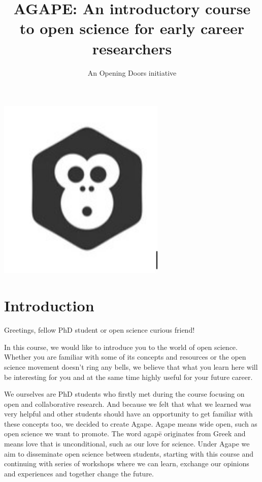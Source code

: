 \documentclass[
]{book}
\title{AGAPE: An introductory course to open science for early career researchers}
\author{An Opening Doors initiative}
\date{}
\theoremstyle{definition}
\theoremstyle{definition}
\theoremstyle{definition}
\theoremstyle{definition}
\theoremstyle{remark}
\begin{document}
\maketitle

{
\setcounter{tocdepth}{1}
\tableofcontents
}
\includegraphics[width=0.6\textwidth,height=\textheight]{images/agapecover.png}

\hypertarget{introduction}{%
\chapter*{Introduction}\label{introduction}}

Greetings, fellow PhD student or open science curious friend!

In this course, we would like to introduce you to the world of open science. Whether you are familiar with some of its concepts and resources or the open science movement doesn't ring any bells, we believe that what you learn here will be interesting for you and at the same time highly useful for your future career.

We ourselves are PhD students who firstly met during the course focusing on open and collaborative research. And because we felt that what we learned was very helpful and other students should have an opportunity to get familiar with these concepts too, we decided to create Agape. Agape means wide open, such as open science we want to promote. The word agapē originates from Greek and means love that is unconditional, such as our love for science. Under Agape we aim to disseminate open science between students, starting with this course and continuing with series of workshops where we can learn, exchange our opinions and experiences and together change the future.
\end{document}
